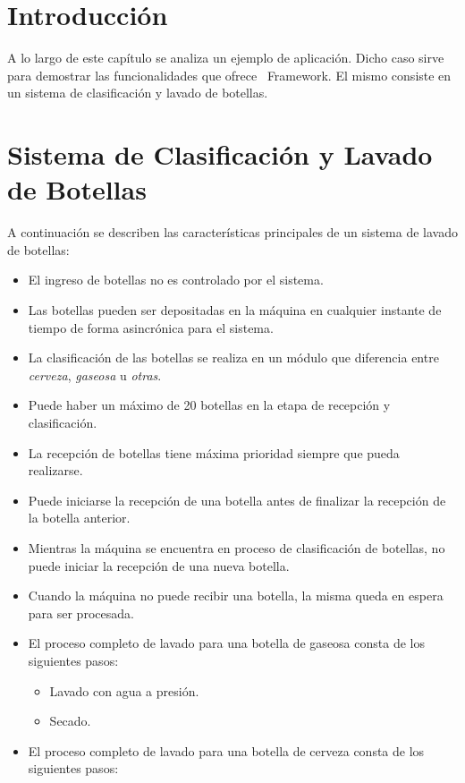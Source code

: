 \section{Introducción}
A lo largo de este capítulo se analiza un ejemplo de aplicación.
Dicho caso sirve para demostrar las funcionalidades que ofrece \nombreFramework
\ Framework. El mismo consiste en un sistema de clasificación y lavado de
botellas.

\section {Sistema de Clasificación y Lavado de Botellas}
A continuación se describen las características principales de un sistema de
lavado de botellas:

\begin{itemize}
  \item El ingreso de botellas no es controlado por el sistema.
  \item Las botellas pueden ser depositadas en la máquina en cualquier instante
  de tiempo de forma asincrónica para el sistema.
  \item La clasificación de las botellas se realiza en un módulo que
  diferencia entre \emph{cerveza}, \emph{gaseosa} u \emph{otras}.
  \item Puede haber un máximo de 20 botellas en la etapa de
  recepción y clasificación.
  \item La recepción de botellas tiene máxima prioridad siempre que pueda
  realizarse.
  \item Puede iniciarse la recepción de una botella antes de finalizar
  la recepción de la botella anterior.
  \item Mientras la máquina se encuentra en proceso de clasificación de
  botellas, no puede iniciar la recepción de una nueva botella.
  \item Cuando la máquina no puede recibir una botella, la misma queda en espera
  para ser procesada.
  \item El proceso completo de lavado para una botella de gaseosa consta de los
  siguientes pasos:
      \begin{itemize} 
        \item Lavado con agua a presión.
        \item Secado.
      \end{itemize}
  \item El proceso completo de lavado para una botella de cerveza consta de los
  siguientes pasos:
      \begin{itemize} 

\end{itemize}
\end{itemize}
